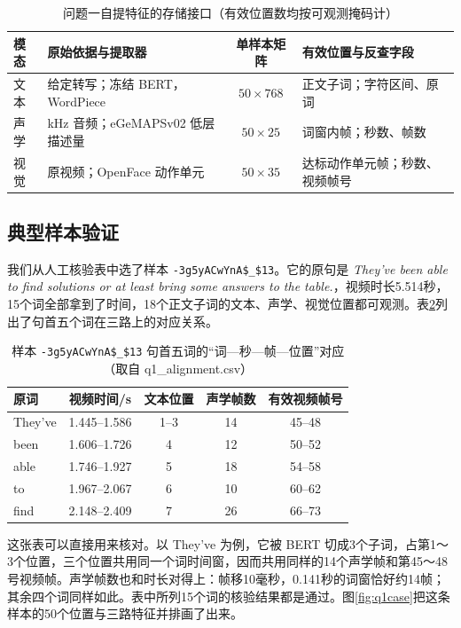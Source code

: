 \begin{table}[htbp]
\centering
\caption{问题一自提特征的存储接口（有效位置数均按可观测掩码计）}
\label{tab:q1io}
\begin{tabularx}{\textwidth}{l>{\raggedright\arraybackslash}Xc>{\raggedright\arraybackslash}X}
\toprule
模态 & 原始依据与提取器 & 单样本矩阵 & 有效位置与反查字段 \\
\midrule
文本 & 给定转写；冻结 BERT，WordPiece & $50\times768$ & 正文子词；字符区间、原词 \\
声学 & 16 kHz 音频；eGeMAPSv02 低层描述量 & $50\times25$ & 词窗内帧；秒数、帧数 \\
视觉 & 原视频；OpenFace 动作单元 & $50\times35$ & 达标动作单元帧；秒数、视频帧号 \\
\bottomrule
\end{tabularx}
\end{table}

\subsection{典型样本验证}\label{sec:q1case}

我们从人工核验表中选了样本 \texttt{-3g5yACwYnA\$\_\$13}。它的原句是 \textit{They've been able to find solutions or at least bring some answers to the table.}，视频时长5.514秒，15个词全部拿到了时间，18个正文子词的文本、声学、视觉位置都可观测。表\ref{tab:q1case}列出了句首五个词在三路上的对应关系。

\begin{table}[htbp]
\centering
\caption{样本 \texttt{-3g5yACwYnA\$\_\$13} 句首五词的“词—秒—帧—位置”对应（取自 q1\_alignment.csv）}
\label{tab:q1case}
\begin{tabular}{lcccc}
\toprule
原词 & 视频时间/s & 文本位置 & 声学帧数 & 有效视频帧号 \\
\midrule
They've & 1.445–1.586 & 1–3 & 14 & 45–48 \\
been & 1.606–1.726 & 4 & 12 & 50–52 \\
able & 1.746–1.927 & 5 & 18 & 54–58 \\
to & 1.967–2.067 & 6 & 10 & 60–62 \\
find & 2.148–2.409 & 7 & 26 & 66–73 \\
\bottomrule
\end{tabular}
\end{table}

这张表可以直接用来核对。以 They've 为例，它被 BERT 切成3个子词，占第1～3个位置，三个位置共用同一个词时间窗，因而共用同样的14个声学帧和第45～48号视频帧。声学帧数也和时长对得上：帧移10毫秒，0.141秒的词窗恰好约14帧；其余四个词同样如此。表中所列15个词的核验结果都是通过。图\ref{fig:q1case}把这条样本的50个位置与三路特征并排画了出来。

